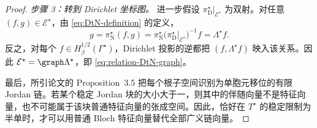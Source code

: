 \begin{proof}
\emph{步骤 3：转到 Dirichlet 坐标图。}
进一步假设
$\pi_{\mathrm D}^\star|_{\mathcal E^\star}$ 为双射。对任意
$(f,g)\in\mathcal E^\star$，由
\eqref{eq:DtN-definition} 的定义，
\[
  g=\pi_{\mathrm N}^\star(f,g)
   =\pi_{\mathrm N}^\star
    \bigl(\pi_{\mathrm D}^\star|_{\mathcal E^\star}\bigr)^{-1}f
   =\Lambda^\star f.
\]
反之，对每个 $f\in H^{1/2}_\beta(\Gamma^\star)$，Dirichlet 投影的逆都把
$(f,\Lambda^\star f)$ 映入该关系。因此
$\mathcal E^\star=\graph\Lambda^\star$，即
\eqref{eq:relation-DtN-graph}。

最后，所引论文的 Proposition~3.5 把每个根子空间识别为单胞元移位的有限 Jordan 链。若某个稳定 Jordan 块的大小大于一，则其中的伴随向量不是特征向量，也不可能属于该块普通特征向量的张成空间。因此，恰好在
$T^\star$ 的稳定限制为半单时，才可以用普通 Bloch 特征向量替代全部广义链向量。
\end{proof}
